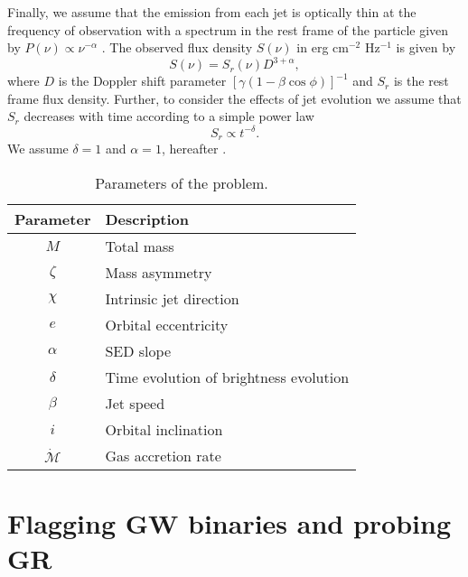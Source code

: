 \documentclass[a4paper,fleqn,usenatbib]{mnras}
\begin{document}
Finally, we assume that the emission from each jet is optically thin
at the frequency of observation with a spectrum in the rest frame of
the particle given by $P(\nu)\propto \nu^{-\alpha}$
\citep{1982ApJ...262..478G}.  The observed flux density $S(\nu)$ in
erg cm$^{-2}$ Hz$^{-1}$ is given by
\begin{equation}
  S(\nu)=S_r(\nu)D^{3+\alpha},
\end{equation}
where $D$ is the Doppler shift parameter
$[\gamma(1-\beta\cos\phi)]^{-1}$ and $S_r$ is the rest frame flux
density.  Further, to consider the effects of jet evolution we assume
that $S_r$ decreases with time according to a simple power law
\begin{equation}
  S_r\propto t^{-\delta}.
\end{equation}
We assume $\delta=1$ and $\alpha=1$, hereafter
\citep{1982ApJ...262..478G}.

\begin{table}
\begin{center}
\begin{tabular}{c l}
\hline 
Parameter & Description \\ 
\hline 
$M$ & Total mass \\
$\zeta$ & Mass asymmetry \\
$\chi$ & Intrinsic jet direction \\
$e$ & Orbital eccentricity \\
$\alpha$ & SED slope \\
$\delta$ & Time evolution of brightness evolution \\
$\beta$ & Jet speed \\
$i$ & Orbital inclination \\ 
$\dot{\mathcal M}$ & Gas accretion rate\\
\hline
\end{tabular}
\end{center}
\caption{Parameters of the problem.}
\label{table:params}
\end{table}

\section{Flagging GW binaries and probing GR}
\end{document}
